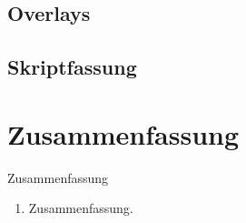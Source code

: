 \subsection{Overlays}

\subsection{Skriptfassung}

\section*{Zusammenfassung}

\begin{frame}{Zusammenfassung}
  \begin{enumerate}
    \item Zusammenfassung.
  \end{enumerate}
\end{frame}